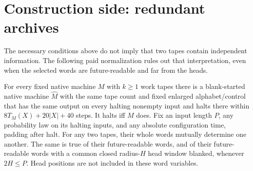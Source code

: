 \section{Construction side: redundant archives}\label{sec:limitations}

The necessary conditions above do not imply that two tapes contain independent
information. The following paid normalization rules out that interpretation,
even when the selected words are future-readable and far from the heads.

\begin{theorem}\label{thm:redundant}
\notformalized
For every fixed native machine $M$ with $k\ge1$ work tapes there is a
blank-started native machine $\widehat M$ with the same tape count and fixed
enlarged alphabet/control that has the same output on every halting nonempty
input and halts there within $8T_M(X)+20|X|+40$ steps. It halts iff $M$ does.
Fix an input length $P$, any probability law on its halting inputs, and any
absolute configuration time, padding after halt. For any two tapes, their
whole words mutually determine one another. The same is true of their
future-readable words, and of their future-readable words with a common
closed radius-$H$ head window blanked, whenever $2H\le P$.
Head positions are not included in these word variables.
\end{theorem}
